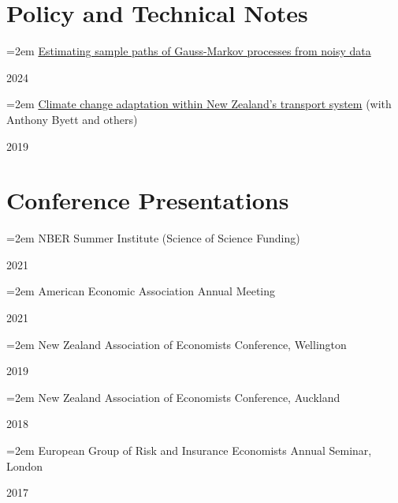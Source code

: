 \documentclass[11pt,oneside]{memoir}
\newcommand{\entry}[2]{\par\parbox[t]{0.9\linewidth}{\strut\raggedright\hangindent=2em #2\strut}\hfill#1}
\begin{document}
	\section{Policy and Technical Notes}
	
		\entry{2024}{\href{https://arxiv.org/abs/2404.00784}{Estimating sample paths of Gauss-Markov processes from noisy data}}
		\entry{2019}{\href{https://motu.nz/assets/Documents/our-work/environment/climate-change-impacts/Transport-Dialogue-Report.pdf}{Climate change adaptation within New Zealand's transport system} (with Anthony Byett and others)}
	
	\section{Conference Presentations}
	
		\entry{2021}{NBER Summer Institute (Science of Science Funding)}
		\entry{2021}{American Economic Association Annual Meeting}
		\entry{2019}{New Zealand Association of Economists Conference, Wellington}
		\entry{2018}{New Zealand Association of Economists Conference, Auckland}
		\entry{2017}{European Group of Risk and Insurance Economists Annual Seminar, London}
\end{document}
